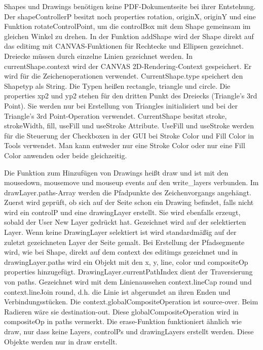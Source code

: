 \par
Shapes und Drawings benötigen keine PDF-Dokumentseite bei ihrer Entstehung. Der shapeControllerP besitzt noch properties rotation, originX, originY und eine Funktion rotateControlPoint, um die controlBox mit dem Shape gemeinsam im gleichen Winkel zu drehen. In der Funktion addShape wird der Shape direkt auf das editimg mit CANVAS-Funktionen für Rechtecke und Ellipsen gezeichnet. Dreiecke müssen durch einzelne Linien gezeichnet werden. In currentShape.context wird der CANVAS 2D-Rendering-Context gespeichert. Er wird für die Zeichenoperationen verwendet. CurrentShape.type speichert den Shapetyp als String. Die Typen heißen rectangle, triangle und circle. Die properties xp2 und yp2 stehen für den dritten Punkt des Dreiecks (Triangle's 3rd Point). Sie werden nur bei Erstellung von Triangles initialisiert und bei der Triangle's 3rd Point-Operation verwendet. CurrentShape besitzt stroke, strokeWidth, fill, useFill und useStroke Attribute. UseFill und useStroke werden für die Steuerung der Checkboxen in der GUI bei Stroke Color und Fill Color in Tools verwendet. Man kann entweder nur eine Stroke Color oder nur eine Fill Color anwenden oder beide gleichzeitig. 
\par 
Die Funktion zum Hinzufügen von Drawings heißt draw und ist mit den mousedown, mousemove und mouseup events auf den write\_layers verbunden. Im drawLayer.paths-Array werden die Pfadpunkte des Zeichenvorgangs angehängt. Zuerst wird geprüft, ob sich auf der Seite schon ein Drawing befindet, falls nicht wird ein controlP und eine drawingLayer erstellt. Sie wird ebenfalls erzeugt, sobald der User New Layer gedrückt hat. Gezeichnet wird auf der selektierten Layer. Wenn keine DrawingLayer selektiert ist wird standardmäßig auf der zuletzt gezeichneten Layer der Seite gemalt. Bei Erstellung der Pfadsegmente wird, wie bei Shape, direkt auf dem context des editimgs gezeichnet und in drawingLayer.paths wird ein Objekt mit den x, y, line, color und compositeOp properties hinzugefügt. DrawingLayer.currentPathIndex dient der Traversierung von paths. Gezeichnet wird mit dem Linienaussehen context.lineCap round und context.lineJoin round, d.h. die Linie ist abgerundet an ihren Enden und Verbindungsstücken. Die context.globalCompositeOperation ist source-over. Beim Radieren wäre sie destination-out. Diese globalCompositeOperation wird in compositeOp in paths vermerkt. Die erase-Funktion funktioniert ähnlich wie draw, nur dass keine Layers, controlPs und drawingLayers erstellt werden. Diese Objekte werden nur in draw erstellt.

